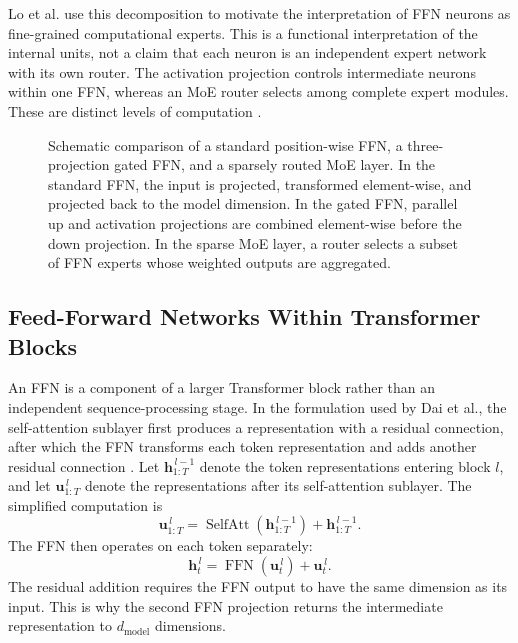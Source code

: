 Lo et al. use this decomposition to motivate the interpretation of FFN
neurons as fine-grained computational experts. This is a functional
interpretation of the internal units, not a claim that each neuron is an
independent expert network with its own router. The activation projection
controls intermediate neurons within one FFN, whereas an MoE router
selects among complete expert modules. These are distinct levels of
computation \parencite{lo2025closer}.

\begin{figure}[htbp]
    \centering
    
    \caption{Schematic comparison of a standard position-wise FFN, a
    three-projection gated FFN, and a sparsely routed MoE layer. In the
    standard FFN, the input is projected, transformed element-wise, and
    projected back to the model dimension. In the gated FFN, parallel up
    and activation projections are combined element-wise before the
    down projection. In the sparse MoE layer, a router selects a subset
    of FFN experts whose weighted outputs are aggregated.}
    \label{fig:ffn-architectures}
\end{figure}

\subsection{Feed-Forward Networks Within Transformer Blocks}
\label{subsec:ffn-transformer-block}

An FFN is a component of a larger Transformer block rather than an
independent sequence-processing stage. In the formulation used by Dai
et al., the self-attention sublayer first produces a representation with
a residual connection, after which the FFN transforms each token
representation and adds another residual connection
\parencite{dai2024deepseekmoe}. Let
\(\mathbf{h}_{1:T}^{\,l-1}\) denote the token representations entering
block \(l\), and let \(\mathbf{u}_{1:T}^{\,l}\) denote the
representations after its self-attention sublayer. The simplified
computation is
\begin{equation}
    \mathbf{u}_{1:T}^{\,l}
    =
    \operatorname{SelfAtt}
    \left(\mathbf{h}_{1:T}^{\,l-1}\right)
    +
    \mathbf{h}_{1:T}^{\,l-1}.
    \label{eq:ffn-attention-residual}
\end{equation}
The FFN then operates on each token separately:
\begin{equation}
    \mathbf{h}_{t}^{\,l}
    =
    \operatorname{FFN}
    \left(\mathbf{u}_{t}^{\,l}\right)
    +
    \mathbf{u}_{t}^{\,l}.
    \label{eq:ffn-block-residual}
\end{equation}
The residual addition requires the FFN output to have the same dimension
as its input. This is why the second FFN projection returns the
intermediate representation to \(d_{\mathrm{model}}\) dimensions.

